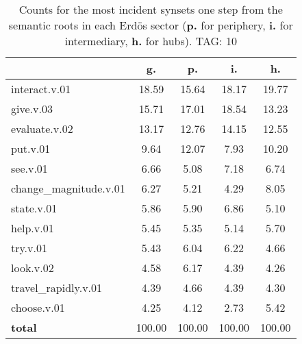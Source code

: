 \begin{table}[h!]
\begin{center}
\begin{tabular}{| l || c | c | c | c |}\hline
 & {\bf g.} & {\bf p.} & {\bf i.} & {\bf h.} \\\hline\hline
interact.v.01 & 18.59  & 15.64  & 18.17  & 19.77 \\\hline
give.v.03 & 15.71  & 17.01  & 18.54  & 13.23 \\\hline
evaluate.v.02 & 13.17  & 12.76  & 14.15  & 12.55 \\\hline
put.v.01 & 9.64  & 12.07  & 7.93  & 10.20 \\\hline
see.v.01 & 6.66  & 5.08  & 7.18  & 6.74 \\\hline
change\_magnitude.v.01 & 6.27  & 5.21  & 4.29  & 8.05 \\\hline
state.v.01 & 5.86  & 5.90  & 6.86  & 5.10 \\\hline
help.v.01 & 5.45  & 5.35  & 5.14  & 5.70 \\\hline
try.v.01 & 5.43  & 6.04  & 6.22  & 4.66 \\\hline
look.v.02 & 4.58  & 6.17  & 4.39  & 4.26 \\\hline
travel\_rapidly.v.01 & 4.39  & 4.66  & 4.39  & 4.30 \\\hline
choose.v.01 & 4.25  & 4.12  & 2.73  & 5.42 \\\hline\hline
{{\bf total}} & 100.00  & 100.00  & 100.00  & 100.00 \\\hline
\end{tabular}
\caption{Counts for the most incident synsets one step from the semantic roots in each Erd\"os sector ({\bf p.} for periphery, {\bf i.} for intermediary, {\bf h.} for hubs). TAG: 10}
\end{center}
\end{table}